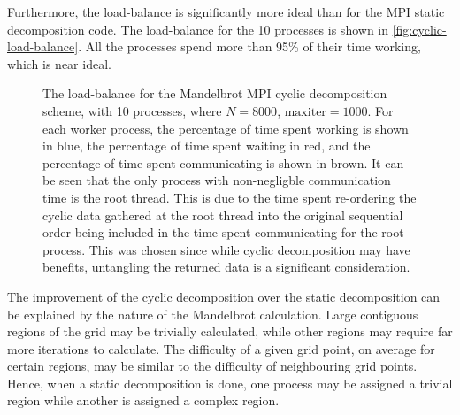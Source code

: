 \documentclass{article}
\begin{document}
Furthermore, the load-balance is significantly more ideal than for the MPI
static decomposition code.
The load-balance for the 10 processes is shown in
\autoref{fig:cyclic-load-balance}.
All the processes spend more than 95\% of their time working, which is near
ideal.
\begin{figure}[h]
  \centering
  \caption{The load-balance for the Mandelbrot MPI cyclic decomposition scheme,
    with 10 processes, where $N = 8000$, $\mathrm{maxiter} = 1000$. For each
    worker process, the percentage of time spent working is shown in blue, the
    percentage of time spent waiting in red, and the percentage of time spent
    communicating is shown in brown. It can be seen that the only process with
    non-negligble communication time is the root thread. This is due to the time
    spent re-ordering the cyclic data gathered at the root thread into the
    original sequential order being included in the time spent communicating for
    the root process. This was chosen since while cyclic decomposition may have
    benefits, untangling the returned data is a significant consideration.}
  \label{fig:cyclic-load-balance}
\end{figure}

The improvement of the cyclic decomposition over the static decomposition can be
explained by the nature of the Mandelbrot calculation.
Large contiguous regions of the grid may be trivially calculated, while other
regions may require far more iterations to calculate.
The difficulty of a given grid point, on average for certain regions, may be
similar to the difficulty of neighbouring grid points.
Hence, when a static decomposition is done, one process may be assigned a
trivial region while another is assigned a complex region.
\end{document}
